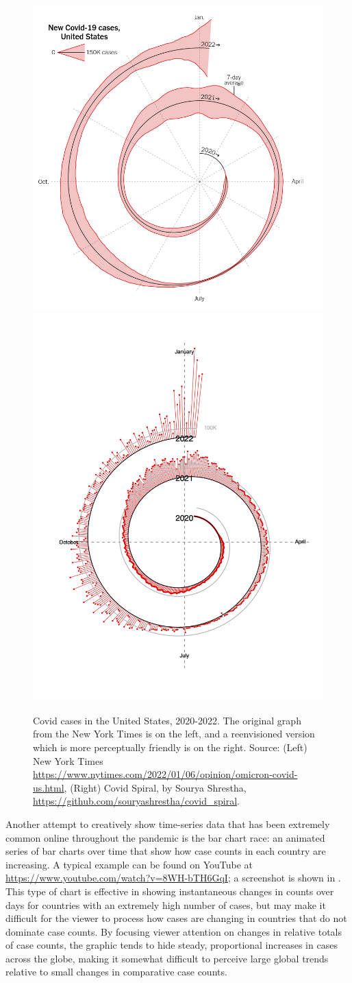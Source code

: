\documentclass[article]{jdssv}\usepackage[]{graphicx}\usepackage[]{color}
\begin{document}
\begin{figure}\centering
\includegraphics[width=.45\linewidth]{nyt-spiral}\hfill\includegraphics[width=.45\linewidth]{spiral-rework}
\caption{Covid cases in the United States, 2020-2022. The original graph from the New York Times is on the left, and a reenvisioned version which is more perceptually friendly is on the right. Source: (Left) New York Times \url{https://www.nytimes.com/2022/01/06/opinion/omicron-covid-us.html}, (Right) Covid Spiral, by Sourya Shrestha, \url{https://github.com/souryashrestha/covid_spiral}.}
\label{fig:nyt-spiral}
\end{figure}

Another attempt to creatively show time-series data that has been extremely common online throughout the pandemic is the bar chart race: an animated series of bar charts over time that show how case counts in each country are increasing. A typical example can be found on YouTube at \url{https://www.youtube.com/watch?v=8WH-bTH6GqI}; a screenshot is shown in . This type of chart is effective in showing instantaneous changes in counts over days for countries with an extremely high number of cases, but may make it difficult for the viewer to process how cases are changing in countries that do not dominate case counts. By focusing viewer attention on changes in relative totals of case counts, the graphic tends to hide steady, proportional increases in cases across the globe, making it somewhat difficult to perceive large global trends relative to small changes in comparative case counts. 
\end{document}
